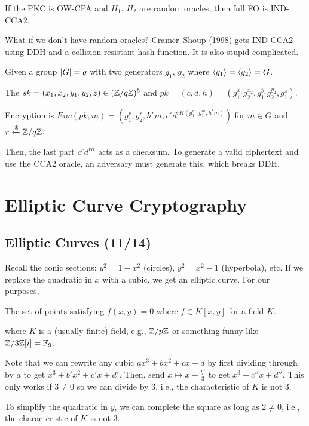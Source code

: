 \documentclass[notes]{agony}
\newcommand{\xgets}{\xleftarrow}
\begin{document}
\begin{theorem}
  If the PKC is OW-CPA and $H_1$, $H_2$ are random oracles,
  then full FO is IND-CCA2.
\end{theorem}

What if we don't have random oracles?
Cramer--Shoup (1998) gets IND-CCA2 using DDH and a collision-resistant hash function.
It is also stupid complicated.

Given a group $\abs{G} = q$ with two generators $g_1$, $g_2$ where $\expval{g_1} = \expval{g_2} = G$.

The $sk = (x_1,x_2,y_1,y_2,z) \in (\mathbb{Z}/q\mathbb{Z})^5$
and $pk = (c,d,h) = (g_1^{x_1}g_2^{x_2}, g_1^{y_1}g_2^{y_2}, g_1^z)$.

Encryption is $Enc(pk, m) = (g_1^r, g_2^r, h^r m, c^r d^{rH(g_1^m, g_2^m, h^r m)})$
for $m \in G$ and $r \xgets{\$} \Z/q\Z$.

Then, the last part $c^r d^{r\alpha}$ acts as a checksum.
To generate a valid ciphertext and use the CCA2 oracle,
an adversary must generate this, which breaks DDH.

\chapter{Elliptic Curve Cryptography}

\section{Elliptic Curves (11/14)}

Recall the conic sections:
$y^2 = 1 - x^2$ (circles), $y^2 = x^2 - 1$ (hyperbola), etc.
If we replace the quadratic in $x$ with a cubic, we get an elliptic curve.
For our purposes,

\begin{defn}[curve]
  The set of points satisfying $f(x,y) = 0$ where $f \in K[x,y]$ for a field $K$.
\end{defn}

where $K$ is a (usually finite) field, e.g., $\mathbb{Z}/p\mathbb{Z}$ or something funny like $\mathbb{Z}/3\mathbb{Z}[i] = \mathbb{F}_9$.

Note that we can rewrite any cubic $ax^3 + bx^2 + cx + d$
by first dividing through by $a$ to get $x^3 + b'x^2 + c'x + d'$.
Then, send $x \mapsto x - \frac{b'}{3}$ to get $x^3 + c''x + d''$.
This only works if $3 \neq 0$ so we can divide by 3,
i.e., the characteristic of $K$ is not 3.

To simplify the quadratic in $y$, we can complete the square as long as
$2 \neq 0$, i.e., the characteristic of $K$ is not 3.
\end{document}

